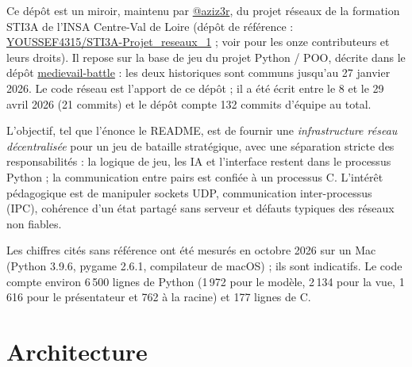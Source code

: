 \documentclass[11pt,a4paper]{article}
\newcommand{\code}[1]{\texttt{\detokenize{#1}}}
\begin{document}
Ce d\'ep\^ot est un miroir, maintenu par \href{https://github.com/aziz3r}{@aziz3r}, du projet r\'eseaux de la formation STI3A de l'INSA Centre-Val de Loire
(d\'ep\^ot de r\'ef\'erence : \href{https://github.com/YOUSSEF4315/STI3A-Projet_reseaux_1}{YOUSSEF4315/STI3A-Projet\_reseaux\_1} ; voir \code{AUTHORS.md}
pour les onze contributeurs et leurs droits). Il repose sur la base de jeu du projet Python / POO, d\'ecrite dans le d\'ep\^ot
\href{https://github.com/aziz3r/medievail-battle}{medievail-battle} : les deux historiques sont communs jusqu'au 27 janvier 2026. Le code r\'eseau est l'apport
de ce d\'ep\^ot ; il a \'et\'e \'ecrit entre le 8 et le 29 avril 2026 (21 commits) et le d\'ep\^ot compte 132 commits d'\'equipe au total.

L'objectif, tel que l'\'enonce le README, est de fournir une \emph{infrastructure r\'eseau d\'ecentralis\'ee} pour un jeu de bataille strat\'egique, avec
une s\'eparation stricte des responsabilit\'es : la logique de jeu, les IA et l'interface restent dans le processus Python ; la communication entre pairs
est confi\'ee \`a un processus C. L'int\'er\^et p\'edagogique est de manipuler sockets UDP, communication inter-processus (IPC), coh\'erence d'un \'etat partag\'e
sans serveur et d\'efauts typiques des r\'eseaux non fiables.

Les chiffres cit\'es sans r\'ef\'erence ont \'et\'e mesur\'es en octobre 2026 sur un Mac (Python 3.9.6, pygame 2.6.1, compilateur de macOS) ; ils sont indicatifs.
Le code compte environ 6\,500 lignes de Python (1\,972 pour le mod\`ele, 2\,134 pour la vue, 1\,616 pour le pr\'esentateur et 762 \`a la racine) et 177 lignes de C.

\section{Architecture}
\end{document}

